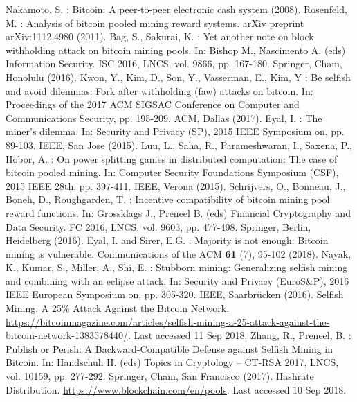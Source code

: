 \begin{thebibliography}{8}
 Nakamoto, S. : Bitcoin: A peer-to-peer electronic cash system (2008). 
 Rosenfeld, M. : Analysis of bitcoin pooled mining reward systems. arXiv preprint arXiv:1112.4980 (2011).
 Bag, S., Sakurai, K. : Yet another note on block withholding attack on bitcoin mining pools. In: Bishop M., Nascimento A. (eds) Information Security. ISC 2016, LNCS, vol. 9866, pp. 167-180. Springer, Cham, Honolulu (2016).  
 Kwon, Y., Kim, D., Son, Y., Vasserman, E., Kim, Y : Be selfish and avoid dilemmas: Fork after withholding (faw) attacks on bitcoin. In: Proceedings of the 2017 ACM SIGSAC Conference on Computer and Communications Security, pp. 195-209. ACM, Dallas (2017).
 Eyal, I. : The miner's dilemma. In: Security and Privacy (SP), 2015 IEEE Symposium on, pp. 89-103. IEEE, San Jose (2015).  
 Luu, L., Saha, R., Parameshwaran, I., Saxena, P., Hobor, A. : On power splitting games in distributed computation: The case of bitcoin pooled mining. In: Computer Security Foundations Symposium (CSF), 2015 IEEE 28th, pp. 397-411. IEEE, Verona (2015). 
 Schrijvers, O., Bonneau, J., Boneh, D., Roughgarden, T. : Incentive compatibility of bitcoin mining pool reward functions. In: Grossklags J., Preneel B. (eds) Financial Cryptography and Data Security. FC 2016, LNCS, vol. 9603, pp. 477-498. Springer, Berlin, Heidelberg (2016). 
 Eyal, I. and Sirer, E.G. : Majority is not enough: Bitcoin mining is vulnerable. Communications of the ACM \textbf{61} (7), 95-102 (2018).
 Nayak, K., Kumar, S., Miller, A., Shi, E. : Stubborn mining: Generalizing selfish mining and combining with an eclipse attack. In: Security and Privacy (EuroS\&P), 2016 IEEE European Symposium on, pp. 305-320. IEEE, Saarbr{\"u}cken (2016).    
 Selfish Mining: A 25\% Attack Against the Bitcoin Network. \url{https://bitcoinmagazine.com/articles/selfish-mining-a-25-attack-against-the-bitcoin-network-1383578440/}. Last accessed 11 Sep 2018.
 Zhang, R., Preneel, B. : Publish or Perish: A Backward-Compatible Defense against Selfish Mining in Bitcoin. In: Handschuh H. (eds) Topics in Cryptology – CT-RSA 2017, LNCS, vol. 10159, pp. 277-292. Springer, Cham, San Francisco (2017).  
 Hashrate Distribution. \url{https://www.blockchain.com/en/pools}. Last accessed 10 Sep 2018.  


\end{thebibliography}